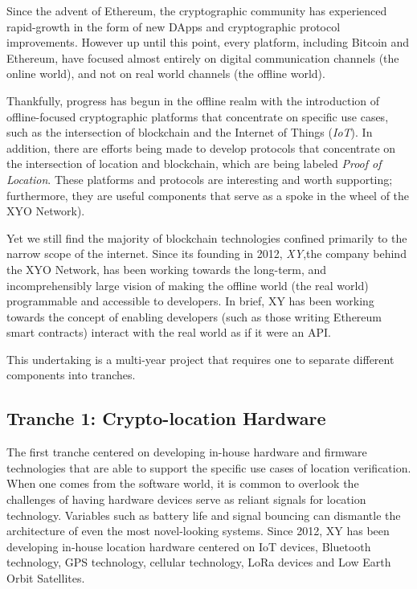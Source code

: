 \documentclass{article}
\begin{document}
Since the advent of Ethereum, the cryptographic community has experienced rapid-growth in the form of new DApps and  cryptographic protocol improvements. However up until this point, every platform, including Bitcoin and Ethereum, have focused almost entirely on digital communication channels (the online world), and not on real world channels (the offline world).

Thankfully, progress has begun in the offline realm with the introduction of offline-focused cryptographic platforms that concentrate on specific use cases, such as the intersection of blockchain and the Internet of Things (\textit{IoT}). In addition, there are efforts being made to develop protocols that concentrate on the intersection of location and blockchain, which are being labeled \textit{Proof of Location}. These platforms and protocols are interesting and worth supporting; furthermore, they are useful components that serve as a spoke in the wheel of the XYO Network).

Yet we still find the majority of blockchain technologies confined primarily to the narrow scope of the internet. Since its founding in 2012, \textit{XY},the company behind the XYO Network, has been working towards the long-term, and incomprehensibly large vision of making the offline world (the real world) programmable and accessible to developers. In brief, XY has been working towards the concept of enabling developers (such as those writing Ethereum smart contracts) interact with the real world as if it were an API.

This undertaking is a multi-year project that requires one to separate different components into tranches. 

\subsection{Tranche 1: Crypto-location Hardware}
The first tranche centered on developing in-house hardware and firmware technologies that are able to support the specific use cases of location verification. When one comes from the software world, it is common to overlook the challenges of having hardware devices serve as reliant signals for location technology. Variables such as battery life and signal bouncing can dismantle the architecture of even the most novel-looking systems. Since 2012, XY has been developing in-house location hardware centered on IoT devices, Bluetooth technology, GPS technology, cellular technology, LoRa devices and Low Earth Orbit Satellites.
\end{document}
